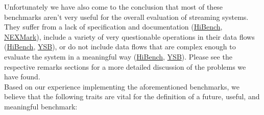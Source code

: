 Unfortunately we have also come to the conclusion that most of these benchmarks aren't very useful for the overall evaluation of streaming systems. They suffer from a lack of specification and documentation (\hyperref[section:hibench-remarks]{HiBench}, \hyperref[section:nexmark-remarks]{NEXMark}), include a variety of very questionable operations in their data flows (\hyperref[section:hibench-remarks]{HiBench}, \hyperref[section:ysb-remarks]{YSB}), or do not include data flows that are complex enough to evaluate the system in a meaningful way (\hyperref[section:hibench-remarks]{HiBench}, \hyperref[section:ysb-remarks]{YSB}). Please see the respective remarks sections for a more detailed discussion of the problems we have found. \\

Based on our experience implementing the aforementioned benchmarks, we believe that the following traits are vital for the definition of a future, useful, and meaningful benchmark:


